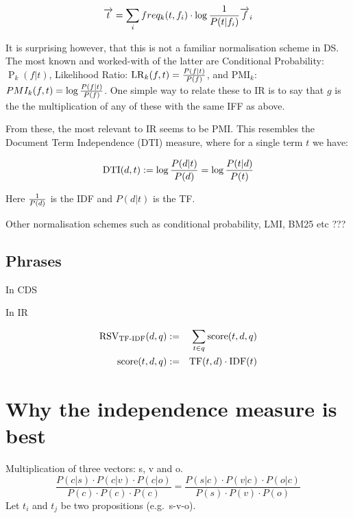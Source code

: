 \begin{equation}
\label{vector-word-idf}
\overrightarrow{t}  = \sum_i  freq_k(t,f_i) \cdot \log{1 \over P(t|f_i)}  \overrightarrow{f}_i
\end{equation}


It is surprising however,   that this is not a familiar normalisation scheme in DS. The  most known and worked-with of the latter are  Conditional Probability: $\operatorname{P}_k(f|t)$,  Likelihood Ratio: $\operatorname{LR}_k(f,t) 
= {{P(f \mid t)} \over{P(f)}}$,  and PMI$_k$: $PMI_k (f, t) =  \log{{P(f \mid t)} \over{P(f)}}$.  One simple way to relate these to IR is to say that $g$ is the the multiplication of any of these with the same  IFF as above. 


From these,  the most relevant to IR seems to be PMI. This resembles the Document Term Independence (DTI) measure, where  for a single term $t$ we have:

\begin{equation}
\label{independence}
\textmd{DTI}(d,t) := \log\frac{P(d | t)}{P(d)} = \log\frac{P(t|d)}{P(t)}
\end{equation}


Here  ${1} \over {P(d)}$ is the IDF and  $P(d| t)$ is the TF. 





Other normalisation schemes such as conditional probability, LMI, BM25 etc ???

\subsection{Phrases}

In CDS


In IR



\begin{eqnarray}
\label{tf-idf-phrase}
\textmd{RSV}_\textmd{TF-IDF}(d,q) &:=& \sum_{t \in q} \textmd{score}(t,d,q)\\
\textmd{score}(t,d,q) &:=&
\textmd{TF}(t,d) \cdot \textmd{IDF}(t)
\end{eqnarray}

\section{Why the independence measure is best}

Multiplication of three vectors: s, v and o.
\[
\frac{
P(c|s) \cdot P(c|v) \cdot P(c|o)}{
P(c) \cdot P(c) \cdot P(c)} =
\frac{
P(s|c) \cdot P(v|c) \cdot P(o|c)
}{
P(s) \cdot P(v) \cdot P(o)
}
\]
Let $t_i$ and $t_j$ be two propositions
(e.g.~s-v-o).

